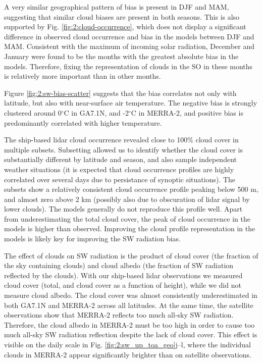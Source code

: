 A very similar geographical pattern of bias is present in DJF and
MAM, suggesting that similar cloud biases are present in both seasons. This
is also supported by Fig. \ref{fig:2:cloud-occurrence}, which does not display
a significant difference in observed cloud occurrence and bias in the models
between DJF and MAM.  Consistent with the maximum of incoming solar radiation,
December and January were found to be the months with the greatest absolute
bias in the models. Therefore, fixing the representation of clouds in the SO
in these months is relatively more important than in other months.

Figure \ref{fig:2:sw-bias-scatter} suggests that the bias correlates not only
with latitude, but also with near-surface air temperature. The negative bias
is strongly clustered around 0$^\circ$C in GA7.1N, and -2$^\circ$C in
MERRA-2, and positive bias is predominantly correlated with higher temperature.

The ship-based lidar cloud occurrence revealed close to 100\% cloud cover in
multiple subsets. Subsetting allowed us to identify whether the cloud cover is
substantially different by latitude and season, and also sample independent
weather situations (it is expected that cloud occurrence profiles are highly
correlated over several days due to persistance of synoptic situations). The
subsets show a relatively consistent cloud occurrence profile peaking below 500
m, and almost zero above 2 km (possibly also due to
obscuration of lidar signal by lower clouds). The models generally do not
reproduce this profile well. Apart from underestimating the total cloud cover,
the peak of cloud occurrence in the models is higher than observed. Improving
the cloud profile representation in the models is likely key for improving the
SW radiation bias.

The effect of clouds on SW radiation is the product of cloud cover (the
fraction of the sky containing clouds) and cloud albedo (the fraction of SW
radiation reflected by the clouds). With our ship-based lidar observations we
measured cloud cover (total, and cloud cover as a function of height), while we
did not measure cloud albedo. The cloud cover was almost consistently
underestimated in both GA7.1N and MERRA-2 across all latitudes. At the same
time, the satellite observations show that MERRA-2 reflects too much all-sky SW
radiation. Therefore, the cloud albedo in MERRA-2 must be too high in order to
cause too much all-sky SW radiation reflection despite the lack of cloud cover.
This effect is visible on the daily scale in Fig.
\ref{fig:2:sw_up_toa_geo}j--l, where the individual clouds in MERRA-2 appear
significantly brighter than on satellite observations.

